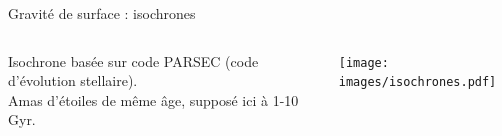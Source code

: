 \documentclass[10pt]{beamer}
\begin{document}
\begin{frame}[fragile]{Gravité de surface : isochrones}
    \begin{columns}
        \begin{column}{0.3\textwidth}
            Isochrone basée sur code PARSEC (code d'évolution stellaire). \\
            \vspace{0.5cm}
            Amas d'étoiles de même âge, supposé ici à 1-10 Gyr. 
        \end{column}
        \begin{column}{0.7\textwidth}
            \begin{center}
                \texttt{[image: images/isochrones.pdf]}
            \end{center}
            
        \end{column}
    \end{columns}
\end{frame}
\end{document}
